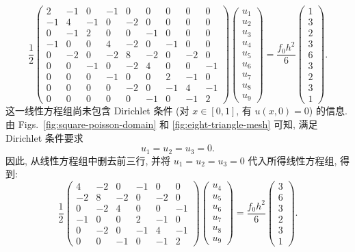 \[\frac12\begin{pmatrix}
2&-1&0&-1&0&0&0&0&0\\-1&4&-1&0&-2&0&0&0&0\\0&-1&2&0&0&-1&0&0&0\\
-1&0&0&4&-2&0&-1&0&0\\0&-2&0&-2&8&-2&0&-2&0\\0&0&-1&0&-2&4&0&0&-1\\
0&0&0&-1&0&0&2&-1&0\\0&0&0&0&-2&0&-1&4&-1\\0&0&0&0&0&-1&0&-1&2
\end{pmatrix}\begin{pmatrix}u_1\\u_2\\u_3\\u_4\\u_5\\u_6\\u_7\\u_8\\u_9\end{pmatrix}
=\frac{f_0h^2}{6}\begin{pmatrix}1\\3\\2\\3\\6\\3\\2\\3\\1\end{pmatrix}.\]
{这一线性方程组尚未包含 Dirichlet 条件 (对 $x\in[0,1]$, 有 $u(x,0)=0$) 的信息. 由 Figs.\ \ref{fig:square-poisson-domain} 和 \ref{fig:eight-triangle-mesh} 可知, 满足 Dirichlet 条件要求}
\[u_1=u_2=u_3=0.\]
{因此, 从线性方程组中删去前三行, 并将 $u_1=u_2=u_3=0$ 代入所得线性方程组, 得到:}
\begin{equation}\label{eq:finite-element-square-system}
\frac12\begin{pmatrix}
4&-2&0&-1&0&0\\-2&8&-2&0&-2&0\\0&-2&4&0&0&-1\\
-1&0&0&2&-1&0\\0&-2&0&-1&4&-1\\0&0&-1&0&-1&2
\end{pmatrix}\begin{pmatrix}u_4\\u_5\\u_6\\u_7\\u_8\\u_9\end{pmatrix}
=\frac{f_0h^2}{6}\begin{pmatrix}3\\6\\3\\2\\3\\1\end{pmatrix}.
\end{equation}
